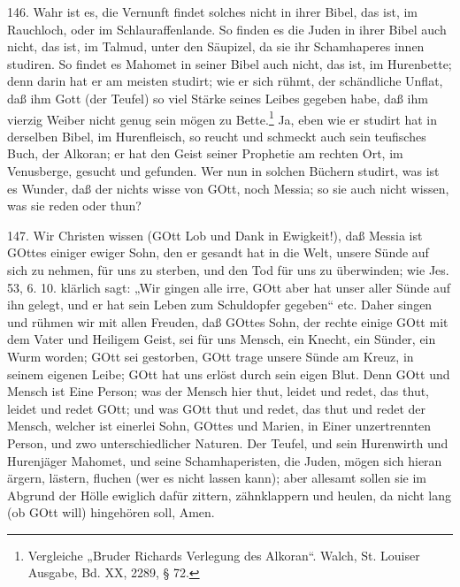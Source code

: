 146. Wahr ist es, die Vernunft findet solches nicht in ihrer Bibel, das ist, im Rauchloch, oder im Schlauraffenlande. So finden es die Juden in ihrer Bibel auch nicht, das ist, im Talmud, unter den Säupizel, da sie ihr Schamhaperes innen studiren. So findet es Mahomet in seiner Bibel auch nicht, das ist, im Hurenbette; denn darin hat er am meisten studirt; wie er sich rühmt, der schändliche Unflat, daß ihm Gott (der Teufel) so viel Stärke seines Leibes gegeben habe, daß ihm vierzig Weiber nicht genug sein mögen zu Bette.\footnote{Vergleiche „Bruder Richards Verlegung des Alkoran“. Walch, St. Louiser Ausgabe, Bd. XX, 2289, § 72.} Ja, eben wie er studirt hat in derselben Bibel, im Hurenfleisch, so reucht und schmeckt auch sein teufisches Buch, der Alkoran; er hat den Geist seiner Prophetie am rechten Ort, im Venusberge, gesucht und gefunden. Wer nun in solchen Büchern studirt, was ist es Wunder, daß der nichts wisse von GOtt, noch Messia; so sie auch nicht wissen, was sie reden oder thun?

147. Wir Christen wissen (GOtt Lob und Dank in Ewigkeit!), daß Messia ist GOttes einiger ewiger Sohn, den er gesandt hat in die Welt, unsere Sünde auf sich zu nehmen, für uns zu sterben, und den Tod für uns zu überwinden; wie Jes. 53, 6. 10. klärlich sagt: „Wir gingen alle irre, GOtt aber hat unser aller Sünde auf ihn gelegt, und er hat sein Leben zum Schuldopfer gegeben“ etc. Daher singen und rühmen wir mit allen Freuden, daß GOttes Sohn, der rechte einige GOtt mit dem Vater und Heiligem Geist, sei für uns Mensch, ein Knecht, ein Sünder, ein Wurm worden; GOtt sei gestorben, GOtt trage unsere Sünde am Kreuz, in seinem eigenen Leibe; GOtt hat uns erlöst durch sein eigen Blut. Denn GOtt und Mensch ist Eine Person; was der Mensch hier thut, leidet und redet, das thut, leidet und redet GOtt; und was GOtt thut und redet, das thut und redet der Mensch, welcher ist einerlei Sohn, GOttes und Marien, in Einer unzertrennten Person, und zwo unterschiedlicher Naturen. Der Teufel, und sein Hurenwirth und Hurenjäger Mahomet, und seine Schamhaperisten, die Juden,
mögen sich hieran ärgern, lästern, fluchen (wer es nicht lassen kann); aber allesamt sollen sie im Abgrund der Hölle ewiglich dafür zittern, zähnklappern und heulen, da nicht lang (ob GOtt will) hingehören soll, Amen.

